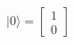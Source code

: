 \documentclass[preview]{standalone}
\begin{document}
\begin{align*}
| 0 \rangle = \begin{bmatrix} 1 \\ 0 \end{bmatrix}
\end{align*}
\end{document}
